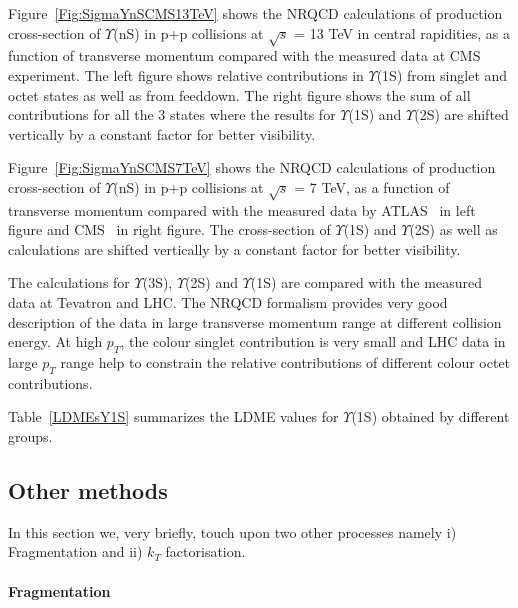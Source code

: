 Figure~\ref{Fig:SigmaYnSCMS13TeV} shows the NRQCD calculations of production cross-section of $\Upsilon$(nS)
      in p+p collisions at $\sqrt{s}$ = 13 TeV in central rapidities, as a function of
      transverse momentum compared with the measured data at CMS~\cite{CMS:2017dju}
      experiment. The left figure shows relative contributions in $\Upsilon$(1S) from
      singlet and octet states as well as from feeddown. The right figure shows the sum
      of all contributions for all the 3 states where the results for $\Upsilon$(1S) and
      $\Upsilon$(2S) are shifted vertically by a constant factor for better visibility.


Figure~\ref{Fig:SigmaYnSCMS7TeV} shows the NRQCD calculations of production cross-section of $\Upsilon$(nS) in
      p+p collisions at $\sqrt{s}$ = 7 TeV, as a function of transverse momentum compared with
      the measured data by ATLAS~\cite{ATLAS:2012lmu} in left figure and CMS~\cite{CMS:2013qur}
      in right figure. The cross-section of $\Upsilon$(1S) and $\Upsilon$(2S) as well as
      calculations are shifted vertically by a constant factor for better visibility.

      The calculations for  $\Upsilon$(3S), $\Upsilon$(2S) and $\Upsilon$(1S) are compared with 
the measured data at Tevatron and LHC. The NRQCD formalism provides  very good description of the data in 
large transverse momentum range at different collision energy. 
   At high $p_T$, the colour singlet contribution is very small and LHC data in large $p_T$ range 
 help to constrain the relative contributions of different colour octet contributions.
  
Table~\ref{LDMEsY1S} summarizes the LDME values for $\Upsilon$(1S) obtained by 
different groups.







\subsection{Other methods}

In this section we, very briefly, touch upon two other processes namely
i) Fragmentation and ii) $k_T$ factorisation. 

\paragraph{Fragmentation}

